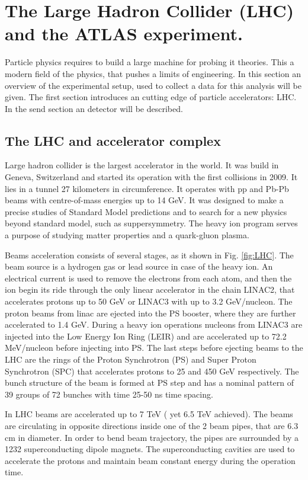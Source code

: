 \chapter{The Large Hadron Collider (LHC) and the ATLAS experiment.}
\minitoc

Particle physics requires to build a large machine for probing it theories. This a modern field of the physics, that pushes a limits of engineering. In this section an overview of the experimental setup, used to collect a data for this analysis will be given. The first section introduces an cutting edge of particle accelerators: LHC. In the send section an \atlas detector will be described. 

\section{The LHC and accelerator complex}

Large hadron collider is the largest accelerator in the world. It was build in Geneva, Switzerland and started its operation with the first collisions in 2009. It lies in a tunnel 27 kilometers in circumference. It operates with pp and Pb-Pb beams with centre-of-mass energies up to 14 GeV. It was designed to make a precise studies of Standard Model predictions and to search for a new physics beyond standard model, such as suppersymmetry. The heavy ion program serves a purpose of studying matter properties and a quark-gluon plasma.

Beams acceleration consists of several stages, as it shown in Fig. \ref{fig:LHC}. The beam source is a hydrogen gas or lead source in case of the heavy ion.  An electrical current is used to remove the electrons from each atom, and then the ion begin its ride through the only linear accelerator in the chain LINAC2, that accelerates protons up to 50 GeV or LINAC3 with up to 3.2 GeV/nucleon. The proton beams from linac are ejected into the PS booster, where they are further accelerated to 1.4 GeV.  During a heavy ion operations nucleons from LINAC3 are injected into the Low Energy Ion Ring (LEIR) and are accelerated up to 72.2 MeV/nucleon before injecting into PS.  The last steps before ejecting beams to the LHC are the rings of the Proton Synchrotron (PS) and Super Proton Synchrotron (SPC) that accelerates protons to 25 and 450 GeV respectively. The bunch structure of the beam is formed at PS step and has a nominal pattern of 39 groups of 72 bunches with time 25-50 ns time spacing. 

In LHC beams are accelerated up to 7 TeV ( yet 6.5 TeV achieved). The beams are circulating in opposite directions inside one of the 2 beam pipes, that are 6.3 cm in diameter. In order to bend beam trajectory, the pipes are surrounded by a 1232 superconducting dipole magnets. The superconducting cavities are used to accelerate the protons and maintain beam constant energy during the operation time. 

